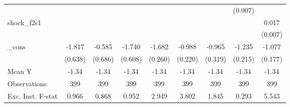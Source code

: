 {\begin{tabular}{l*{8}{c}}
            &                     &                     &                     &                     &                     &                     &     (0.007)         &                     \\
\addlinespace
shock\_f2s1  &                     &                     &                     &                     &                     &                     &                     &       0.017\sym{**} \\
            &                     &                     &                     &                     &                     &                     &                     &     (0.007)         \\
\addlinespace
\_cons      &      -1.817\sym{***}&      -0.585         &      -1.740\sym{***}&      -1.682\sym{***}&      -0.988\sym{***}&      -0.965\sym{***}&      -1.235\sym{***}&      -1.077\sym{***}\\
            &     (0.638)         &     (0.686)         &     (0.608)         &     (0.260)         &     (0.220)         &     (0.319)         &     (0.215)         &     (0.177)         \\
\midrule
Mean Y      &       -1.34         &       -1.34         &       -1.34         &       -1.34         &       -1.34         &       -1.34         &       -1.34         &       -1.34         \\
Observations&         399         &         399         &         399         &         399         &         399         &         399         &         399         &         399         \\
Exc. Inst. F-stat&       0.966         &       0.868         &       0.952         &       2.949         &       3.802         &       1.845         &       0.293         &       5.543         \\
\bottomrule
\end{tabular}
}
